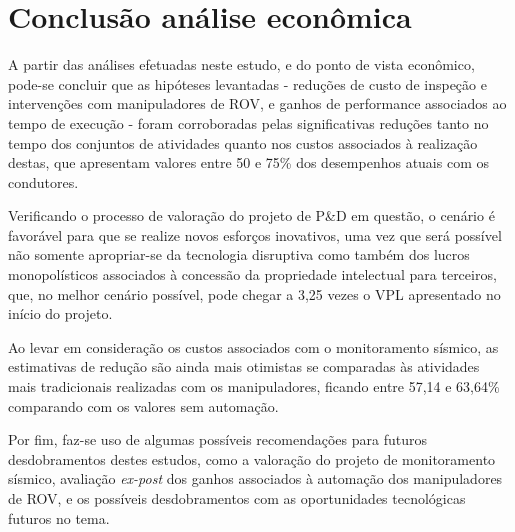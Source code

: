 \section{Conclusão análise econômica}
\label{sec:rskdesen}

A partir das análises efetuadas neste estudo, e do ponto de vista econômico, pode-se concluir que as hipóteses levantadas - reduções de custo de inspeção e intervenções com manipuladores de ROV, e ganhos de performance associados ao tempo de execução - foram corroboradas pelas significativas reduções tanto no tempo dos conjuntos de atividades quanto nos custos associados à realização destas, que apresentam valores entre 50 e 75\% dos desempenhos atuais com os condutores. 

Verificando o processo de valoração do projeto de P\&D em questão, o cenário é favorável para que se realize novos esforços inovativos, uma vez que será possível não somente apropriar-se da tecnologia disruptiva como também dos lucros monopolísticos associados à concessão da propriedade intelectual para terceiros, que, no melhor cenário possível, pode chegar a 3,25 vezes o VPL apresentado no início do projeto. 

Ao levar em consideração os custos associados com o monitoramento sísmico, as estimativas de redução são ainda mais otimistas se comparadas às atividades mais tradicionais realizadas com os manipuladores, ficando entre 57,14 e 63,64\% comparando com os valores sem automação. 

Por fim, faz-se uso de algumas possíveis recomendações para futuros desdobramentos destes estudos, como a valoração do projeto de monitoramento sísmico, avaliação \textit{ex-post} dos ganhos associados à automação dos manipuladores de ROV, e os possíveis desdobramentos com as oportunidades tecnológicas futuros no tema. 


